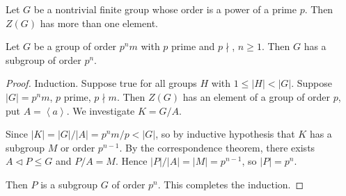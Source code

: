 \begin{theorem}
	Let $G$ be a nontrivial finite group whose order is a power of a prime $p$. Then $Z(G) $ has more than one element.
\end{theorem}

\begin{theorem}
	Let $G$ be a group of order $p^n m$ with $p$ prime and $p \nmid $, $n \ge 1$. Then $G$ has a subgroup of order $p^n$.
\end{theorem}
\begin{proof}
	Induction. Suppose true for all groups $H $ with $1 \le |H| < |G|$. Suppose $|G| = p^n m$, $p $ prime, $p \nmid m$. Then $Z(G)$ has an element of a group of order $p$, put $A = \left\langle a \right\rangle $. We investigate $K = G / A$.
 
	Since $|K| = |G| / |A| = p^n m / p < |G|$, so by inductive hypothesis that $K $ has a subgroup $M$ or order $p^{n -1}$. By the correspondence theorem, there exists $A \triangleleft P \le G$ and $P / A = M$. Hence $|P| / |A| = |M| = p^{n-1}$, so $|P| = p^n$.

	Then $P$ is a subgroup $G$ of order $p^n$. This completes the induction.
\end{proof}

